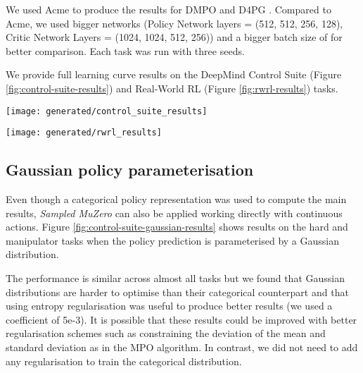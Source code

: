 \documentclass{article}
\newcommand{\smuzero}{\emph{Sampled MuZero}}
\newcommand{\dmcs}{DeepMind Control Suite }
\newcommand{\rwrl}{Real-World RL }
\begin{document}
We used Acme \cite{hoffman2020acme} to produce the results for DMPO \cite{hoffman2020acme} and D4PG \cite{d4pg}. Compared to Acme, we used bigger networks (Policy Network layers = (512, 512, 256, 128), Critic Network Layers = (1024, 1024, 512, 256)) and a bigger batch size of  for better comparison. Each task was run with three seeds.

We provide full learning curve results on the \dmcs (Figure \ref{fig:control-suite-results}) and \rwrl (Figure \ref{fig:rwrl-results}) tasks.

\begin{figure*}
\texttt{[image: generated/control\_suite\_results]}
\vspace*{-7mm}
\caption[]{
\label{fig:control-suite-results}
\textbf{Results in DM Control Suite tasks.} Performance of \smuzero{} (3 seeds per experiment) throughout training compared to DMPO \cite{hoffman2020acme} and D4PG \cite{d4pg}. The x-axis shows millions of environment frames, the y-axis mean episode return. Tasks are grouped into easy, medium and hard as proposed by \cite{hoffman2020acme}. Plot titles include the task name and the dimensionality of the action space.
}
\end{figure*}

\begin{figure*}
\texttt{[image: generated/rwrl\_results]}
\vspace*{-7mm}
\caption[]{
\label{fig:rwrl-results}
\textbf{\smuzero{} results for the Real-Word RL benchmark.} Performance of \smuzero{} (3 seeds per experiment) throughout training on the easy, medium and hard variations of difficulty. The x-axis shows millions of environment frames, the y-axis mean episode return. Tasks are grouped into easy, medium and hard. Plot titles include the task name.
}
\end{figure*}

\subsection{Gaussian policy parameterisation}
\label{gaussian}
Even though a categorical policy representation was used to compute the main results, \smuzero{} can also be applied working directly with continuous actions. Figure \ref{fig:control-suite-gaussian-results} shows results on the hard and manipulator tasks when the policy prediction is parameterised by a Gaussian distribution.

The performance is similar across almost all tasks but we found that Gaussian distributions are harder to optimise than their categorical counterpart and  that using entropy regularisation was useful to produce better results (we used a coefficient of 5e-3). It is possible that these results could be improved with better regularisation schemes such as constraining the deviation of the mean and standard deviation as in the MPO \cite{mpo} algorithm. In contrast, we did not need to add any regularisation to train the categorical distribution.
\end{document}
